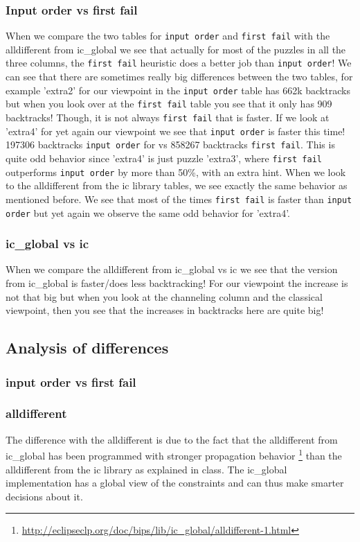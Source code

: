 \documentclass{report}
\begin{document}
\subsubsection{Input order vs first fail}
When we compare the two tables for \texttt{input order} and \texttt{first fail} with the alldifferent from ic\_global we see that actually for most of the puzzles in all the three columns, the \texttt{first fail} heuristic does a better job than \texttt{input order}! We can see that there are sometimes really big differences between the two tables, for example 'extra2' for our viewpoint in the \texttt{input order} table has 662k backtracks but when you look over at the \texttt{first fail} table you see that it only has 909 backtracks! Though, it is not always \texttt{first fail} that is faster. If we look at 'extra4' for yet again our viewpoint we see that \texttt{input order} is faster this time! 197306 backtracks \texttt{input order} for vs 858267 backtracks \texttt{first fail}. This is quite odd behavior since 'extra4' is just puzzle 'extra3', where \texttt{first fail} outperforms \texttt{input order} by more than 50\%, with an extra hint.
\newline
\newline
When we look to the alldifferent from the ic library tables, we see exactly the same behavior as mentioned before. We see that most of the times \texttt{first fail} is faster than \texttt{input order} but yet again we observe the same odd behavior for 'extra4'.

\subsubsection{ic\_global vs ic}
When we compare the alldifferent from ic\_global vs ic we see that the version from ic\_global is faster/does less backtracking! For our viewpoint the increase is not that big but when you look at the channeling column and the classical viewpoint, then you see that the increases in backtracks here are quite big!

\subsection{Analysis of differences}
\subsubsection{input order vs first fail}

\subsubsection{alldifferent}
The difference with the alldifferent is due to the fact that the alldifferent from ic\_global has been programmed with stronger propagation behavior \footnote{\url{http://eclipseclp.org/doc/bips/lib/ic\_global/alldifferent-1.html}} than the alldifferent from the ic library as explained in class. The ic\_global implementation has a global view of the constraints and can thus make smarter decisions about it.
\newpage
\end{document}
